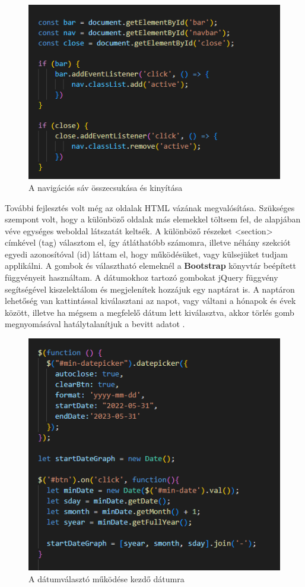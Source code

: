 \begin{figure}[h]
\centering
\includegraphics[scale=0.8]{images/navbarFunction.png}
\caption{A navigációs sáv összecsukása és kinyítása}
\label{fig:navbarfunc}
\end{figure}

További fejlesztés volt még az oldalak HTML vázának megvalósítása. Szükséges szempont volt, hogy a különböző oldalak más elemekkel töltsem fel, de alapjában véve egységes weboldal látszatát keltsék. A különböző részeket <section> címkével (tag) választom el, így átláthatóbb számomra, illetve néhány szekciót egyedi azonosítóval (id) láttam el, hogy működésüket, vagy külsejüket tudjam applikálni. A gombok és választható elemeknél a \textbf{Bootstrap} könyvtár beépített függvényeit használtam. A dátumokhoz tartozó gombokat jQuery függvény segítségével kiszelektálom és megjelenítek hozzájuk egy naptárat is. A naptáron lehetőség van kattintással kiválasztani az napot, vagy váltani a hónapok és évek között, illetve ha mégsem a megfelelő dátum lett kiválasztva, akkor törlés gomb megnyomásával hatálytalanítjuk a bevitt adatot .

\begin{figure}[h]
\centering
\includegraphics[scale=0.7]{images/datepicker.png}
\caption{A dátumválasztó működése kezdő dátumra}
\label{fig:datepicker}
\end{figure}

